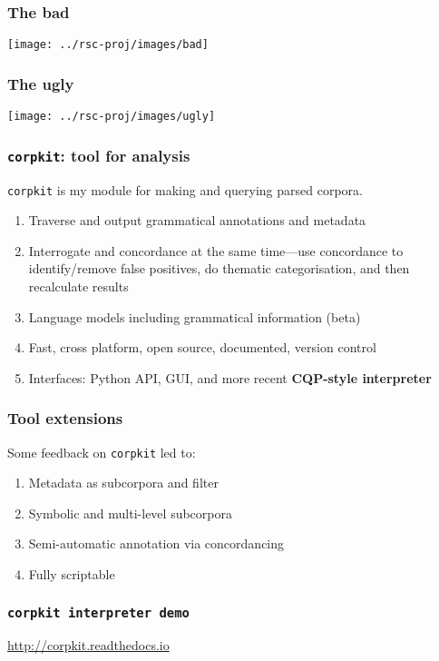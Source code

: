 \documentclass{beamer}       %
\begin{document}
\begin{frame}
    \frametitle{The bad}
    \centering
    \texttt{[image: ../rsc-proj/images/bad]}
\end{frame}

\begin{frame}
    \frametitle{The ugly}
    \centering
    \texttt{[image: ../rsc-proj/images/ugly]}
\end{frame}



\begin{frame}
\frametitle{\texttt{corpkit}: tool for analysis}

\texttt{corpkit} is my module for making and querying parsed corpora.

\begin{enumerate}
    \item Traverse and output grammatical annotations and metadata
    \item Interrogate and concordance at the same time---use concordance to identify\slash remove false positives, do thematic categorisation, and then recalculate results
    \item Language models including grammatical information (beta)
    \item Fast, cross platform, open source, documented, version control 
    \item Interfaces: Python API, GUI, and more recent \textbf{CQP-style interpreter}
\end{enumerate}
\end{frame}

\begin{frame}
\frametitle{Tool extensions}

Some feedback on \texttt{corpkit} led to:

\begin{enumerate}
    \item Metadata as subcorpora and filter
    \item Symbolic and multi-level subcorpora
    \item Semi-automatic annotation via concordancing
    \item Fully scriptable
\end{enumerate}
\end{frame}

\begin{frame}
\frametitle{\texttt{corpkit interpreter demo}}

\url{http://corpkit.readthedocs.io}

\end{frame}
\end{document}

